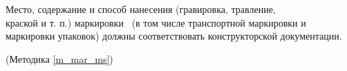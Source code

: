 Место, содержание и способ нанесения (гравировка, травление,\\ краской и т. п.) маркировки \dut \ (в том числе транспортной маркировки и маркировки упаковок) должны соответствовать конструкторской документации.

\begin{flushright}
(Методика \ref{m_mar_ms})
\end{flushright}

